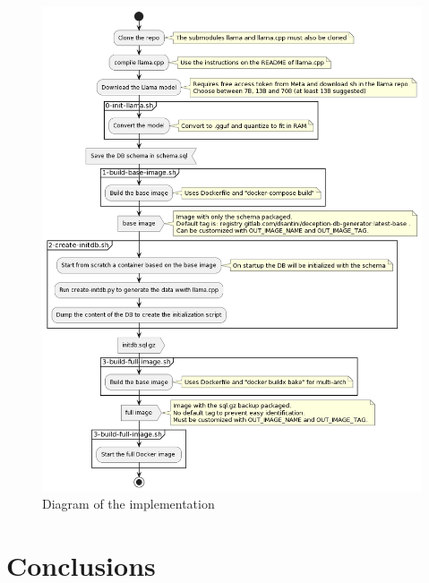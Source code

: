 \documentclass[12pt, letterpaper, twoside]{article}
\begin{document}
\begin{figure}
    \centering
    \includegraphics[width=0.9\linewidth]{diagram.png}
    \caption{Diagram of the implementation}
    \label{fig:diagram}
\end{figure}

\section{Conclusions}
\label{sec:conc}






% 
% 

\appendix

\end{document}
